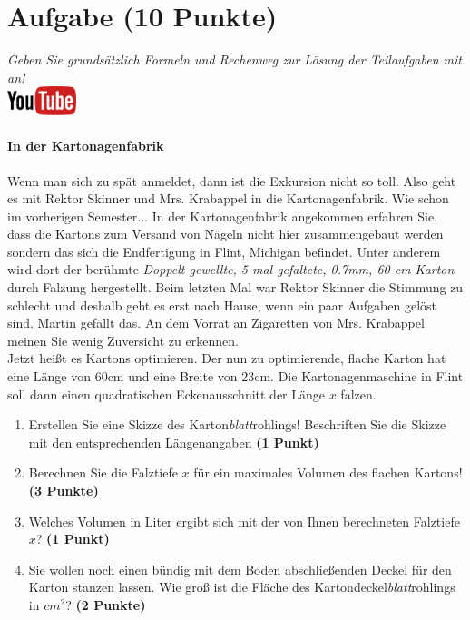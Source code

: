\documentclass[a4paper, 9pt]{scrartcl}\usepackage[]{graphicx}\usepackage[]{xcolor}
\begin{document}
 
\clearpage

\section{Aufgabe \hfill (10 Punkte)}

\textit{Geben Sie grunds{\"a}tzlich Formeln und Rechenweg zur L{\"o}sung der
  Teilaufgaben mit an!} \\[1Ex]

\hfill\href{https://youtu.be/RuzMjwvwT-4}{\includegraphics[width =
  2cm]{img/youtube}} %
\hspace{2Ex}

\paragraph{In der Kartonagenfabrik}



Wenn man sich zu sp{\"a}t anmeldet, dann ist die Exkursion nicht so toll. Also
geht es mit Rektor Skinner und Mrs. Krabappel in die Kartonagenfabrik. Wie
schon im vorherigen Semester... In der Kartonagenfabrik angekommen erfahren
Sie, dass die Kartons zum Versand von N{\"a}geln nicht hier zusammengebaut
werden sondern das sich die Endfertigung in Flint, Michigan befindet. Unter
anderem wird dort der ber{\"u}hmte \textit{Doppelt gewellte,
  5-mal-gefaltete, 0.7mm, 60-cm-Karton} durch
Falzung hergestellt. Beim letzten Mal war Rektor Skinner die Stimmung zu
schlecht und deshalb geht es erst nach Hause, wenn ein paar Aufgaben gel{\"o}st
sind. Martin gef{\"a}llt das. An dem Vorrat
an Zigaretten von Mrs. Krabappel meinen Sie wenig Zuversicht zu erkennen.\\

Jetzt hei{\ss}t es Kartons optimieren. Der nun zu optimierende, flache Karton
hat eine L{\"a}nge von 60cm und eine Breite von 23cm. Die
Kartonagenmaschine in Flint soll dann einen quadratischen Eckenausschnitt
der L{\"a}nge $x$ falzen.

\begin{enumerate}
\item Erstellen Sie eine Skizze des Karton\textit{blatt}rohlings!
  Beschriften Sie die Skizze mit den entsprechenden L{\"a}ngenangaben
  \textbf{(1 Punkt)}
\item Berechnen Sie die Falztiefe $x$ f{\"u}r ein maximales Volumen des flachen
  Kartons! \textbf{(3 Punkte)}
\item Welches Volumen in Liter ergibt sich mit der von Ihnen berechneten
  Falztiefe $x$?  \textbf{(1 Punkt)}
\item Sie wollen noch einen b{\"u}ndig mit dem Boden abschlie{\ss}enden Deckel f{\"u}r
  den Karton stanzen lassen. Wie gro{\ss} ist die Fl{\"a}che des
  Kartondeckel\textit{blatt}rohlings in $cm^2$? \textbf{(2 Punkte)}
\end{enumerate}
\end{document}
